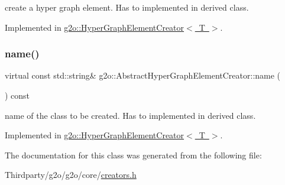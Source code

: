 create a hyper graph element. Has to implemented in derived class. 

Implemented in \mbox{\hyperlink{classg2o_1_1_hyper_graph_element_creator_af5e58366dd05b49700076e0c4ace31e3}{g2o\+::\+Hyper\+Graph\+Element\+Creator$<$ T $>$}}.

\mbox{\label{classg2o_1_1_abstract_hyper_graph_element_creator_a238928fbbfd6e473b2c61002112e6f5f}} 
\subsubsection{\texorpdfstring{name()}{name()}}
{\footnotesize\ttfamily virtual const std\+::string\& g2o\+::\+Abstract\+Hyper\+Graph\+Element\+Creator\+::name (\begin{DoxyParamCaption}{ }\end{DoxyParamCaption}) const\hspace{0.3cm}{\ttfamily [pure virtual]}}

name of the class to be created. Has to implemented in derived class. 

Implemented in \mbox{\hyperlink{classg2o_1_1_hyper_graph_element_creator_a9350df173e72ccb4bb6594d282a2c0e7}{g2o\+::\+Hyper\+Graph\+Element\+Creator$<$ T $>$}}.



The documentation for this class was generated from the following file\+:\begin{DoxyCompactItemize}
\item 
Thirdparty/g2o/g2o/core/\mbox{\hyperlink{creators_8h}{creators.\+h}}\end{DoxyCompactItemize}
